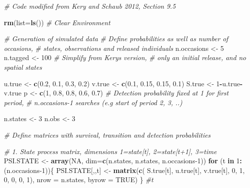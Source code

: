 \documentclass[
]{krantz}
\makeatletter
\newenvironment{Shaded}{\begin{snugshade}}{\end{snugshade}}
\newcommand{\AttributeTok}[1]{\textcolor[rgb]{0.27,0.27,0.27}{#1}}
\newcommand{\CommentTok}[1]{\textcolor[rgb]{0.37,0.37,0.37}{\textit{#1}}}
\newcommand{\ConstantTok}[1]{\textcolor[rgb]{0.37,0.37,0.37}{#1}}
\newcommand{\ControlFlowTok}[1]{\textcolor[rgb]{0.27,0.27,0.27}{\textbf{#1}}}
\newcommand{\DecValTok}[1]{\textcolor[rgb]{0.06,0.06,0.06}{#1}}
\newcommand{\FloatTok}[1]{\textcolor[rgb]{0.06,0.06,0.06}{#1}}
\newcommand{\FunctionTok}[1]{\textcolor[rgb]{0.27,0.27,0.27}{\textbf{#1}}}
\newcommand{\NormalTok}[1]{#1}
\newcommand{\OtherTok}[1]{\textcolor[rgb]{0.37,0.37,0.37}{#1}}
\newcommand{\SpecialCharTok}[1]{\textcolor[rgb]{0.43,0.43,0.43}{\textbf{#1}}}
\newenvironment{kframe}{%
\medskip{}
\setlength{\fboxsep}{.8em}
 \def\at@end@of@kframe{}%
 \ifinner\ifhmode%
  \def\at@end@of@kframe{\end{minipage}}%
  \begin{minipage}{\columnwidth}%
 \fi\fi%
 \def\FrameCommand##1{\hskip\@totalleftmargin \hskip-\fboxsep
 \colorbox{shadecolor}{##1}\hskip-\fboxsep
     \hskip-\linewidth \hskip-\@totalleftmargin \hskip\columnwidth}%
 \MakeFramed {\advance\hsize-\width
   \@totalleftmargin\z@ \linewidth\hsize
   \@setminipage}}%
 {\par\unskip\endMakeFramed%
 \at@end@of@kframe}
\renewenvironment{Shaded}{\begin{kframe}}{\end{kframe}}
\makeatother
\begin{document}
\begin{Shaded}
\begin{Highlighting}[]
\CommentTok{\# Code modified from Kery and Schaub 2012, Section 9.5}

\FunctionTok{rm}\NormalTok{(}\AttributeTok{list=}\FunctionTok{ls}\NormalTok{()) }\CommentTok{\# Clear Environment}

\CommentTok{\# Generation of simulated data}
\CommentTok{\# Define probabilities as well as number of occasions, }
\CommentTok{\# states, observations and released individuals}
\NormalTok{n.occasions }\OtherTok{\textless{}{-}} \DecValTok{5}
\NormalTok{n.tagged }\OtherTok{\textless{}{-}} \DecValTok{100}  \CommentTok{\# Simplify from Kery\textquotesingle{}s version, }
                 \CommentTok{\# only an initial release, and no spatial states}

\NormalTok{u.true }\OtherTok{\textless{}{-}} \FunctionTok{c}\NormalTok{(}\FloatTok{0.2}\NormalTok{, }\FloatTok{0.1}\NormalTok{, }\FloatTok{0.3}\NormalTok{, }\FloatTok{0.2}\NormalTok{)}
\NormalTok{v.true }\OtherTok{\textless{}{-}} \FunctionTok{c}\NormalTok{(}\FloatTok{0.1}\NormalTok{, }\FloatTok{0.15}\NormalTok{, }\FloatTok{0.15}\NormalTok{, }\FloatTok{0.1}\NormalTok{)}
\NormalTok{S.true }\OtherTok{\textless{}{-}} \DecValTok{1}\SpecialCharTok{{-}}\NormalTok{u.true}\SpecialCharTok{{-}}\NormalTok{v.true}
\NormalTok{p }\OtherTok{\textless{}{-}} \FunctionTok{c}\NormalTok{(}\DecValTok{1}\NormalTok{, }\FloatTok{0.8}\NormalTok{, }\FloatTok{0.8}\NormalTok{, }\FloatTok{0.6}\NormalTok{, }\FloatTok{0.7}\NormalTok{)}
\CommentTok{\#  Detection probability fixed at 1 for first period, }
\CommentTok{\# n.occasions{-}1 searches (e.g start of period 2, 3, ..)}

\NormalTok{n.states }\OtherTok{\textless{}{-}} \DecValTok{3}
\NormalTok{n.obs }\OtherTok{\textless{}{-}} \DecValTok{3}

\CommentTok{\# Define matrices with survival, transition and detection probabilities}

\CommentTok{\# 1. State process matrix, dimensions 1=state[t], 2=state[t+1], 3=time}
\NormalTok{PSI.STATE }\OtherTok{\textless{}{-}} \FunctionTok{array}\NormalTok{(}\ConstantTok{NA}\NormalTok{, }\AttributeTok{dim=}\FunctionTok{c}\NormalTok{(n.states, n.states, n.occasions}\DecValTok{{-}1}\NormalTok{))}
   \ControlFlowTok{for}\NormalTok{ (t }\ControlFlowTok{in} \DecValTok{1}\SpecialCharTok{:}\NormalTok{(n.occasions}\DecValTok{{-}1}\NormalTok{))\{}
\NormalTok{      PSI.STATE[,,t] }\OtherTok{\textless{}{-}} \FunctionTok{matrix}\NormalTok{(}\FunctionTok{c}\NormalTok{(}
\NormalTok{      S.true[t], u.true[t], v.true[t],}
      \DecValTok{0}\NormalTok{, }\DecValTok{1}\NormalTok{, }\DecValTok{0}\NormalTok{,}
      \DecValTok{0}\NormalTok{, }\DecValTok{0}\NormalTok{, }\DecValTok{1}\NormalTok{), }\AttributeTok{nrow =}\NormalTok{ n.states, }\AttributeTok{byrow =} \ConstantTok{TRUE}\NormalTok{)}
\NormalTok{      \} }\CommentTok{\#t}


\end{Highlighting}
\end{Shaded}
\end{document}
